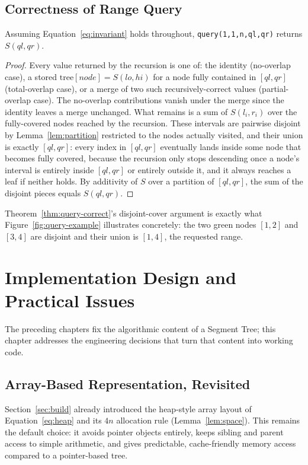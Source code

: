 \section{Correctness of Range Query}
\begin{thm}\label{thm:query-correct}
Assuming Equation~\eqref{eq:invariant} holds throughout, \texttt{query(1,1,n,ql,qr)} returns $S(ql,qr)$.
\end{thm}
\begin{proof}
Every value returned by the recursion is one of: the identity (no-overlap case), a stored $\text{tree}[node]=S(lo,hi)$ for a node fully contained in $[ql,qr]$ (total-overlap case), or a merge of two such recursively-correct values (partial-overlap case). The no-overlap contributions vanish under the merge since the identity leaves a merge unchanged. What remains is a sum of $S(l_i,r_i)$ over the fully-covered nodes reached by the recursion. These intervals are pairwise disjoint by Lemma~\ref{lem:partition} restricted to the nodes actually visited, and their union is exactly $[ql,qr]$: every index in $[ql,qr]$ eventually lands inside some node that becomes fully covered, because the recursion only stops descending once a node's interval is entirely inside $[ql,qr]$ or entirely outside it, and it always reaches a leaf if neither holds. By additivity of $S$ over a partition of $[ql,qr]$, the sum of the disjoint pieces equals $S(ql,qr)$.
\end{proof}

\begin{remark}
Theorem~\ref{thm:query-correct}'s disjoint-cover argument is exactly what Figure~\ref{fig:query-example} illustrates concretely: the two green nodes $[1,2]$ and $[3,4]$ are disjoint and their union is $[1,4]$, the requested range.
\end{remark}

\chapter{Implementation Design and Practical Issues}
\label{ch:implementation}

The preceding chapters fix the algorithmic content of a Segment Tree; this chapter addresses the engineering decisions that turn that content into working code.

\section{Array-Based Representation, Revisited}
Section~\ref{sec:build} already introduced the heap-style array layout of Equation~\eqref{eq:heap} and its $4n$ allocation rule (Lemma~\ref{lem:space}). This remains the default choice: it avoids pointer objects entirely, keeps sibling and parent access to simple arithmetic, and gives predictable, cache-friendly memory access compared to a pointer-based tree.

